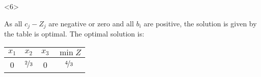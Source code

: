 \begin{frameExample}{}{}
\begin{description}
  \end{description}

\begin{onlyenv}<6>

{%
  \centering
      \par
    }

 As \alert{all $c_j - Z_j$ are negative or zero and all $b_i$ are positive}, the solution is given by the table is optimal. The optimal solution is:

 
 {\centering
   \begin{tabular}{cccc}
     $x_1$&$x_2$&$x_3$& $\min Z$\\
     \midrule
     0&$\nicefrac{2}{3}$&0& $\cellcolor{yellow}\nicefrac{4}{3}$
   \end{tabular}
 \par}
      
  \end{onlyenv}  
\end{frameExample}




  
